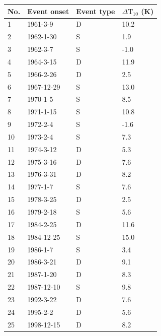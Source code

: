 \begin{table}
\begin{centering}
    \begin{tabular}{|l|l|l|l|}  \hline
    No. & Event onset & Event type & $\Delta \mathrm{T}_{10}$ (K) \\ \hline
    1   & 1961-3-9    & D          & 10.2        \\
    2   & 1962-1-30   & S          & 1.9         \\
    3   & 1962-3-7    & S          & -1.0        \\
    4   & 1964-3-15   & D          & 11.9        \\
    5   & 1966-2-26   & D          & 2.5         \\
    6   & 1967-12-29  & S          & 13.0        \\
    7   & 1970-1-5    & S          & 8.5         \\
    8   & 1971-1-15   & S          & 10.8        \\
    9   & 1972-2-4    & S          & -1.6        \\
    10  & 1973-2-4    & S          & 7.3         \\
    11  & 1974-3-12   & D          & 5.3         \\
    12  & 1975-3-16   & D          & 7.6         \\
    13  & 1976-3-31   & D          & 8.2         \\
    14  & 1977-1-7    & S          & 7.6         \\
    15  & 1978-3-25   & D          & 2.5         \\
    16  & 1979-2-18   & S          & 5.6         \\
    17  & 1984-2-25   & D          & 11.6        \\
    18  & 1984-12-25  & S          & 15.0        \\
    19  & 1986-1-7    & S          & 3.4         \\
    20  & 1986-3-21   & D          & 9.1         \\
    21  & 1987-1-20   & D          & 8.3         \\
    22  & 1987-12-10  & S          & 9.8         \\
    23  & 1992-3-22   & D          & 7.6         \\
    24  & 1995-2-2    & D          & 5.6         \\
    25  & 1998-12-15  & D          & 8.2         \\

\end{tabular}
\end{centering}
\end{table}
